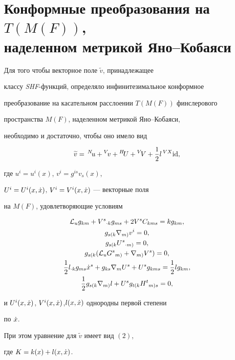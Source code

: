 \section{Конформные преобразования на $T(M(F))$,\protect\\


наделенном метрикой Яно--Кобаяси}





\begin{thm} Для того чтобы векторное поле $\widetilde{v}$, принадлежащее


классу {\em SHF}-функций, определяло инфинитезимальное конформное 


преобразование на касательном расслоении $T(M(F))$ финслерового  


пространства $M(F)$, наделенном метрикой Яно--Кобаяси, 


необходимо и достаточно, чтобы оно имело вид


$$


\widetilde{v} =\,{}^{N}\! u +{}^{V}\! v +{}^{H}\! U +{}^{V}\! V + 


\frac{1}{2}l\, {}^{VX}{\id},


$$


где $u^{i} = u^{i}(x)$, $v^{i} = g^{is}v_{s}(x)$, 


$U^{i} = U^{i}(x,\Dot x)$, $V^{i} = V^{i}(x,\Dot x)$ --- векторные поля 


на $M(F)$, удовлетворяющие условиям


\begin{gather}


{\lie}_{u}g_{km} + V^{s}{}_{\cdot k}g_{ms} + 2V^{s}C_{kms} = 


kg_{km}, \notag \\


g_{s(k}\nabla_{m)}v^{i} = 0, \notag \\


g_{s(k}U^{s}{}_{\cdot m)} = 0, \notag \\


g_{s(k}({\lie}_{u}G^{s}{}_{m)} + \nabla_{m)}V^{s})= 0, \\


\frac{1}{2}l_{\cdot k}g_{ms}\xt^{s} + g_{ks}\nabla_{m}U^{s} + 


U^{s}g_{kms} = \frac{1}{2}lg_{km}, \notag \\


\frac{1}{2}g_{s(k}\nabla_{m)}l + U^{s}g_{t(k}H^{t}{}_{m)s} = 0,\notag


\end{gather}


и $U^{i}(x,\Dot x)$, $V^{i}(x,\Dot x)$,$l(x,\Dot x)$ однородны первой степени 


по $\Dot x $.


При этом уравнение для $\widetilde{v}$ имеет вид $(2)$,


где $K = k(x) + l(x,\Dot x)$.


\end{thm}





